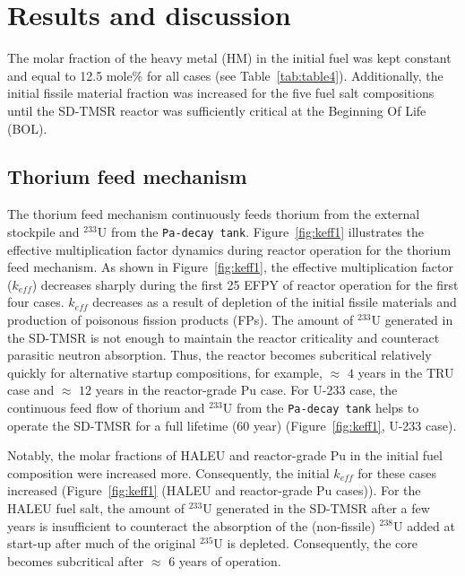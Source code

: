 \section{Results and discussion} \label{Results-and-discussion}
The molar fraction of the heavy metal (HM) 
in the initial fuel was kept constant and equal to 12.5 mole\% for all cases (see Table~\ref{tab:table4}). 
Additionally, the initial fissile material fraction was increased for the five fuel 
salt compositions until the SD-TMSR reactor was sufficiently critical at 
the Beginning Of Life (BOL).
\subsection{Thorium feed mechanism}
The thorium feed mechanism continuously feeds thorium from the external stockpile and 
$^{233}$U from the \texttt{Pa-decay tank}.
Figure~\ref{fig:keff1} illustrates the effective multiplication factor 
dynamics during reactor operation for the thorium feed mechanism. As shown in 
Figure~\ref{fig:keff1}, the effective multiplication factor ($k_{eff}$) 
decreases sharply during the first 25 \gls{EFPY} of reactor operation for the first 
four cases. $k_{eff}$ decreases as a result of depletion of the initial 
fissile materials and production of poisonous fission products (FPs). The amount of $^{233}$U generated in 
the SD-TMSR is not enough to maintain the reactor criticality and 
counteract parasitic neutron absorption. Thus, the 
reactor becomes subcritical relatively quickly for alternative startup 
compositions, for example, $\approx$ $4$ years in the \gls{TRU} case and $\approx$ $12$ 
years in the reactor-grade Pu case. For U-233 case, 
the continuous feed flow of thorium and $^{233}$U from the \texttt{Pa-decay tank} helps to operate the 
SD-TMSR for a full lifetime (60 year) (Figure~\ref{fig:keff1}, U-233 case).

Notably, the molar fractions of \gls{HALEU} and reactor-grade Pu in the initial fuel composition were increased
more. Consequently, the initial $k_{eff}$ for these cases increased (Figure~\ref{fig:keff1} (HALEU and reactor-grade Pu cases)).
For the HALEU fuel salt, the amount of $^{233}$U generated in the SD-TMSR after a few years is insufficient to counteract the absorption of the (non-fissile) $^{238}$U added at start-up after much of the original $^{235}$U is depleted. Consequently, the core becomes subcritical after $\approx$ $6$ years of operation.

